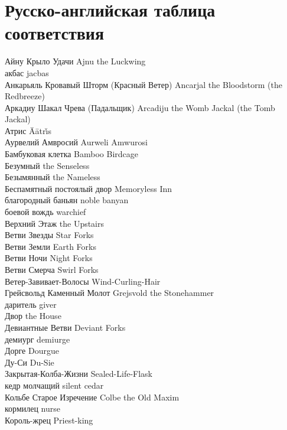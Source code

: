 \documentclass[a4paper,10pt]{book}
\begin{document}
\section{Русско-английская таблица соответствия}

Айну Крыло Удачи \hfill Ajnu the Luckwing\\
акбас \hfill jacbas\\
Анкарьяль Кровавый Шторм (Красный Ветер) \hfill Ancarjal the Bloodstorm (the 
Redbreeze)\\
Аркадиу Шакал Чрева (Падальщик) \hfill Arcadiju the Womb Jackal (the Tomb 
Jackal)\\
Атрис \hfill \"{A}\={a}tr\v{\i}s\\
Аурвелий Амвросий \hfill Aurweli Amwurosi\\
Бамбуковая клетка \hfill Bamboo Birdcage\\
Безумный \hfill the Senseless\\
Безымянный \hfill the Nameless\\
Беспамятный постоялый двор \hfill Memoryless Inn\\
благородный баньян \hfill noble banyan\\
боевой вождь \hfill warchief\\
Верхний Этаж \hfill the Upstairs\\
Ветви Звезды \hfill Star Forks\\
Ветви Земли \hfill Earth Forks\\
Ветви Ночи \hfill Night Forks\\
Ветви Смерча \hfill Swirl Forks\\
Ветер-Завивает-Волосы \hfill Wind-Curling-Hair\\
Грейсвольд Каменный Молот \hfill Grejsvold the Stonehammer\\
даритель \hfill giver\\
Двор \hfill the House\\
Девиантные Ветви \hfill Deviant Forks\\
демиург \hfill demiurge\\
Дорге \hfill Dourgue\\
Ду-Си \hfill Du-Sie\\
Закрытая-Колба-Жизни \hfill Sealed-Life-Flask\\
кедр молчащий \hfill silent cedar\\
Кольбе Старое Изречение \hfill Colbe the Old Maxim\\
кормилец \hfill nurse\\
Король-жрец \hfill Priest-king\\
\end{document}
